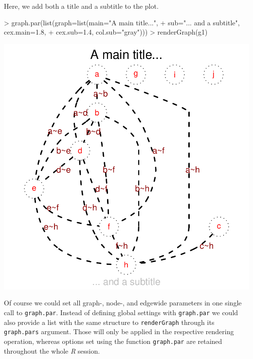 \documentclass{article}
\newcommand{\Rfunction}[1]{{\texttt{#1}}}
\newcommand{\Robject}[1]{{\texttt{#1}}}
\newcommand{\R}[0]{{\textit{R}}}
\begin{document}
Here, we add both a title and a subtitle to the plot.
\begin{Schunk}
\begin{Sinput}
> graph.par(list(graph=list(main="A main title...", 
+                sub="... and a subtitle", cex.main=1.8, 
+                cex.sub=1.4, col.sub="gray")))
> renderGraph(g1)
\end{Sinput}
\end{Schunk}
\includegraphics{newRgraphvizInterface-graphpardefs}

Of course we could set all graph-, node-, and edgewide parameters in
one single call to \Rfunction{graph.par}. Instead of defining global
settings with \Rfunction{graph.par} we could also provide a list with
the same structure to \Rfunction{renderGraph} through its
\Robject{graph.pars} argument. Those will only be applied in the
respective rendering operation, whereas options set using the function
\Rfunction{graph.par} are retained throughout the whole \R{} session.


\end{document}
